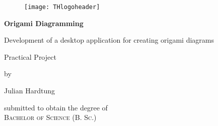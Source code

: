 
\begin{titlepage}

\begin{center}

\begin{figure}[!ht]
\texttt{[image: THlogoheader]}
\end{figure}

\vspace{0.8cm}

\begin{rmfamily}
\begin{huge}
\textbf{Origami Diagramming}\\
\end{huge}
\vspace{0.5cm}
\begin{LARGE}
Development of a desktop application for creating origami diagrams\\
\end{LARGE}
\end{rmfamily}

\vspace{1.6cm}

\begin{LARGE}
	\begin{scshape}
		Practical Project\\[0.8em]
	\end{scshape}
\end{LARGE}

\begin{large}
	by\\
	\vspace{0.2cm}
	\begin{LARGE}
		Julian Hardtung\\
	\end{LARGE}
\end{large}

\vspace{1.0cm}

\begin{large}
	submitted to obtain the degree of\\
	\vspace{0.2cm}
	\textsc{Bachelor of Science (B. Sc.)}\\
\end{large}

\vspace{0.4cm}


\end{center}
\end{titlepage}
